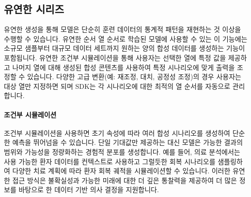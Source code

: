 \subsection{유연한 시리즈}
유연한 생성을 통해 모델은 단순히 훈련 데이터의 통계적 패턴을 재현하는 것 이상을 수행할 수 있습니다. 유연한 순서 열 순서로 학습된 모델에 사용할 수 있는 이 기능에는 소규모 샘플부터 대규모 데이터 세트까지 원하는 양의 합성 데이터를 생성하는 기능이 포함됩니다. 유연한 조건부 시뮬레이션을 통해 사용자는 선택한 열에 특정 값을 제공하고 나머지 열에 대해 생성된 합성 콘텐츠를 사용하여 특정 시나리오에 맞게 출력을 조정할 수 있습니다. 다양한 고급 변환(예: 재조정, 대치, 공정성 조정)의 경우 사용자는 대상 열만 지정하면 되며 SDK는 각 시나리오에 대한 최적의 열 순서를 자동으로 관리합니다.




\paragraph{조건부 시뮬레이션}
조건부 시뮬레이션을 사용하면 초기 속성에 따라 여러 합성 시나리오를 생성하여 단순한 예측을 뛰어넘을 수 있습니다. 단일 기대값만 제공하는 대신 모델은 가능한 결과의 범위와 가능성을 정량화하는 경험적 분포를 생성합니다. 예를 들어, 의료 분석에서는 사용 가능한 환자 데이터를 컨텍스트로 사용하고 그럴듯한 회복 시나리오를 샘플링하여 다양한 치료 계획에 따라 환자 회복 궤적을 시뮬레이션할 수 있습니다. 이러한 유연한 접근 방식은 불확실성과 가능한 미래에 대한 더 깊은 통찰력을 제공하여 더 많은 정보를 바탕으로 한 데이터 기반 의사 결정을 지원합니다.

